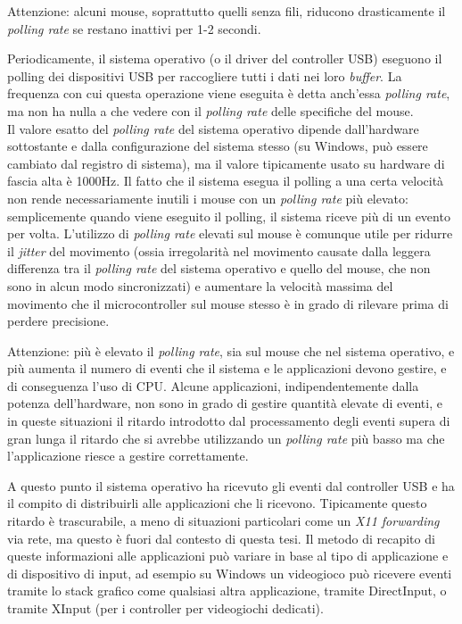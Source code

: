 Attenzione: alcuni mouse, soprattutto quelli senza fili, riducono drasticamente il \textit{polling rate} se restano inattivi per 1-2 secondi.

Periodicamente, il sistema operativo (o il driver del controller USB) eseguono il polling dei dispositivi USB per raccogliere tutti i dati nei loro \textit{buffer}. La frequenza con cui questa operazione viene eseguita è detta anch'essa \textit{polling rate}, ma non ha nulla a che vedere con il \textit{polling rate} delle specifiche del mouse.\\
Il valore esatto del \textit{polling rate} del sistema operativo dipende dall'hardware sottostante e dalla configurazione del sistema stesso (su Windows, può essere cambiato dal registro di sistema), ma il valore tipicamente usato su hardware di fascia alta è 1000Hz. Il fatto che il sistema esegua il polling a una certa velocità non rende necessariamente inutili i mouse con un \textit{polling rate} più elevato: semplicemente quando viene eseguito il polling, il sistema riceve più di un evento per volta. L'utilizzo di \textit{polling rate} elevati sul mouse è comunque utile per ridurre il \textit{jitter} del movimento (ossia irregolarità nel movimento causate dalla leggera differenza tra il \textit{polling rate} del sistema operativo e quello del mouse, che non sono in alcun modo sincronizzati) e aumentare la velocità massima del movimento che il microcontroller sul mouse stesso è in grado di rilevare prima di perdere precisione.

Attenzione: più è elevato il \textit{polling rate}, sia sul mouse che nel sistema operativo, e più aumenta il numero di eventi che il sistema e le applicazioni devono gestire, e di conseguenza l'uso di CPU. Alcune applicazioni, indipendentemente dalla potenza dell'hardware, non sono in grado di gestire quantità elevate di eventi, e in queste situazioni il ritardo introdotto dal processamento degli eventi supera di gran lunga il ritardo che si avrebbe utilizzando un \textit{polling rate} più basso ma che l'applicazione riesce a gestire correttamente.

A questo punto il sistema operativo ha ricevuto gli eventi dal controller USB e ha il compito di distribuirli alle applicazioni che li ricevono. Tipicamente questo ritardo è trascurabile, a meno di situazioni particolari come un \textit{X11 forwarding} via rete, ma questo è fuori dal contesto di questa tesi. Il metodo di recapito di queste informazioni alle applicazioni può variare in base al tipo di applicazione e di dispositivo di input, ad esempio su Windows un videogioco può ricevere eventi tramite lo stack grafico come qualsiasi altra applicazione, tramite DirectInput, o tramite XInput (per i controller per videogiochi dedicati).

